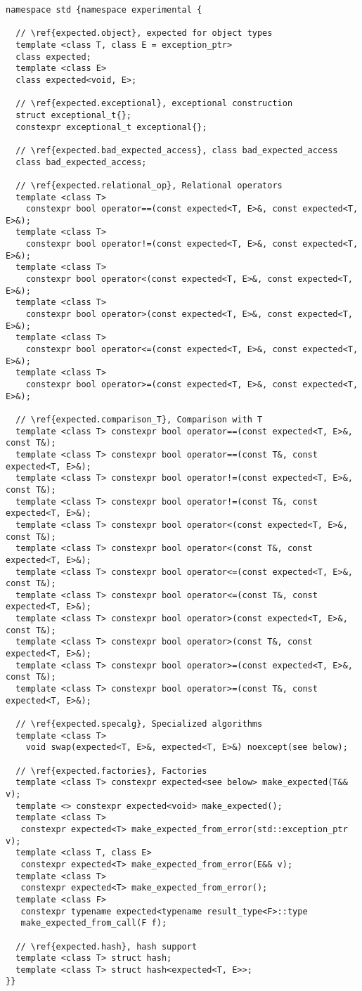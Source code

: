 \documentclass[a4paper,10pt]{article}
\begin{document}
\begin{lstlisting}
namespace std {namespace experimental {

  // \ref{expected.object}, expected for object types  
  template <class T, class E = exception_ptr>
  class expected;
  template <class E>
  class expected<void, E>;
  
  // \ref{expected.exceptional}, exceptional construction
  struct exceptional_t{};
  constexpr exceptional_t exceptional{};
   
  // \ref{expected.bad_expected_access}, class bad_expected_access
  class bad_expected_access;
  
  // \ref{expected.relational_op}, Relational operators
  template <class T>
    constexpr bool operator==(const expected<T, E>&, const expected<T, E>&);
  template <class T>
    constexpr bool operator!=(const expected<T, E>&, const expected<T, E>&);
  template <class T>
    constexpr bool operator<(const expected<T, E>&, const expected<T, E>&);
  template <class T>
    constexpr bool operator>(const expected<T, E>&, const expected<T, E>&);
  template <class T>
    constexpr bool operator<=(const expected<T, E>&, const expected<T, E>&);
  template <class T>
    constexpr bool operator>=(const expected<T, E>&, const expected<T, E>&);
    
  // \ref{expected.comparison_T}, Comparison with T
  template <class T> constexpr bool operator==(const expected<T, E>&, const T&);
  template <class T> constexpr bool operator==(const T&, const expected<T, E>&);
  template <class T> constexpr bool operator!=(const expected<T, E>&, const T&);
  template <class T> constexpr bool operator!=(const T&, const expected<T, E>&);
  template <class T> constexpr bool operator<(const expected<T, E>&, const T&);
  template <class T> constexpr bool operator<(const T&, const expected<T, E>&);
  template <class T> constexpr bool operator<=(const expected<T, E>&, const T&);
  template <class T> constexpr bool operator<=(const T&, const expected<T, E>&);
  template <class T> constexpr bool operator>(const expected<T, E>&, const T&);
  template <class T> constexpr bool operator>(const T&, const expected<T, E>&);
  template <class T> constexpr bool operator>=(const expected<T, E>&, const T&);
  template <class T> constexpr bool operator>=(const T&, const expected<T, E>&);

  // \ref{expected.specalg}, Specialized algorithms
  template <class T> 
    void swap(expected<T, E>&, expected<T, E>&) noexcept(see below);

  // \ref{expected.factories}, Factories
  template <class T> constexpr expected<see below> make_expected(T&& v);
  template <> constexpr expected<void> make_expected(); 
  template <class T>
   constexpr expected<T> make_expected_from_error(std::exception_ptr v); 
  template <class T, class E>
   constexpr expected<T> make_expected_from_error(E&& v);
  template <class T>
   constexpr expected<T> make_expected_from_error(); 
  template <class F>
   constexpr typename expected<typename result_type<F>::type
   make_expected_from_call(F f);

  // \ref{expected.hash}, hash support
  template <class T> struct hash;
  template <class T> struct hash<expected<T, E>>;
}}
\end{lstlisting}
\end{document}

